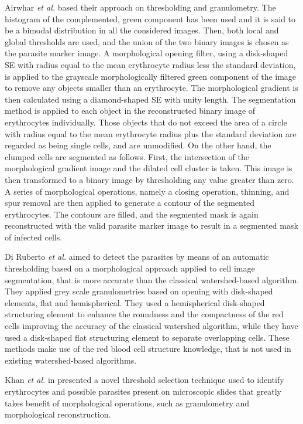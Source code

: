 \documentclass[sensors,review,submit,moreauthors,pdftex,10pt,a4paper]{mdpi}
\begin{document}
	Airwhar \emph{et al.} \cite{Ahirwar2012} based their approach on thresholding and granulometry. The histogram of the complemented, green component has been used and it is said to be a bimodal distribution in all the considered images. Then, both local and global thresholds are used, and the union of the two binary images is chosen as the parasite marker image. A morphological opening filter, using a disk-shaped SE with radius equal to the mean erythrocyte radius less the standard deviation, is applied to the grayscale morphologically filtered green component of the image to remove any objects smaller than an erythrocyte. The morphological gradient is then calculated using a diamond-shaped SE with unity length. The segmentation method is applied to each object in the reconstructed binary image of erythrocytes individually. Those objects that do not exceed the area of a circle with radius equal to the mean erythrocyte radius plus the standard deviation are regarded as being single cells, and are unmodified.
	On the other hand, the clumped cells are segmented as follows. First, the intersection of the morphological gradient image and the dilated cell cluster is taken. This image is then transformed to a binary image by thresholding any value greater than zero. A series of morphological operations, namely a closing operation, thinning, and spur removal are then applied to generate a contour of the segmented erythrocytes. The contours are filled, and the segmented mask is again reconstructed with the valid parasite marker image to result in a segmented mask of infected cells.
	
	Di Ruberto \emph{et al.} \cite{DiRuberto2002} aimed to detect the parasites by means of an automatic thresholding based on a morphological approach applied to cell image segmentation, that is more accurate than the classical watershed-based algorithm. They applied grey scale granulometries based on opening with disk-shaped elements, flat and hemispherical. They used a hemispherical disk-shaped structuring element to enhance the roundness and the compactness of the red cells improving the accuracy of the classical watershed algorithm, while they have used a disk-shaped flat structuring element to separate overlapping cells. These methods make use of the red blood cell structure knowledge, that is not used in existing watershed-based algorithms.
	
	Khan \emph{et al.} in \cite{Khan2011} presented a novel threshold selection technique used to identify erythrocytes and possible parasites present on microscopic slides that greatly takes benefit of morphological operations, such as granulometry and morphological reconstruction.
	
\end{document}
